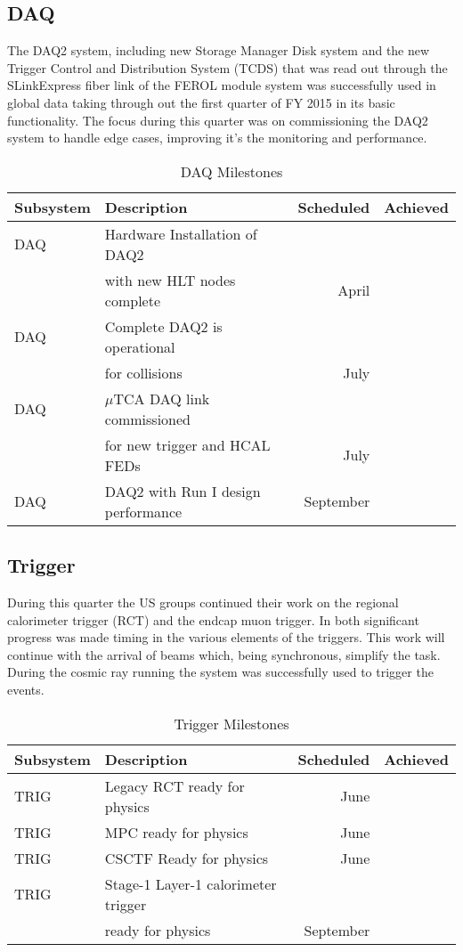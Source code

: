 \subsection{DAQ}
The DAQ2 system, including new Storage Manager Disk system and the new Trigger Control and Distribution System (TCDS) that was read out through the SLinkExpress fiber link of the FEROL module system was successfully used in global data taking through out the first quarter of FY 2015 in its basic functionality. The focus during this quarter was on commissioning the DAQ2 system to handle edge cases, improving it's the monitoring and performance.
\begin{table}[h]
\caption{DAQ Milestones}
\begin{center}
\begin{tabular}{|l|l|r|r|}
\hline
Subsystem&Description&Scheduled&Achieved\\
\hline
DAQ& Hardware Installation of DAQ2& & \\
& with new HLT nodes complete& April & \\
\hline
DAQ& Complete DAQ2 is operational & & \\
&for collisions& July & \\
\hline
DAQ&$\mu$TCA DAQ link commissioned & & \\
&for new trigger and HCAL FEDs& July & \\
\hline
DAQ&DAQ2 with Run I design performance & September & \\
\hline
\end{tabular}
\end{center}
\label{DAQMilestones}
\end{table}


\subsection{Trigger}
During this quarter the US groups continued their work on the regional calorimeter trigger (RCT) and the endcap muon trigger.  In both significant progress was made timing in the various elements of the triggers.   
This work will continue with the arrival of beams which, being synchronous, simplify the task.  During the cosmic ray running the system was successfully used to trigger the events.
\begin{table}[h]
\caption{Trigger Milestones}
\begin{center}
\begin{tabular}{|l|l|r|r|}
\hline
Subsystem&Description&Scheduled&Achieved\\
\hline
TRIG&Legacy RCT ready for physics&June &\\
\hline
TRIG&MPC ready for physics&June &\\
\hline
TRIG&CSCTF Ready for physics&June & \\
\hline
TRIG& Stage-1 Layer-1 calorimeter trigger&&\\
& ready for physics &September&\\
\hline
\end{tabular}
\end{center}
\label{TriggerMilestones}
\end{table}
